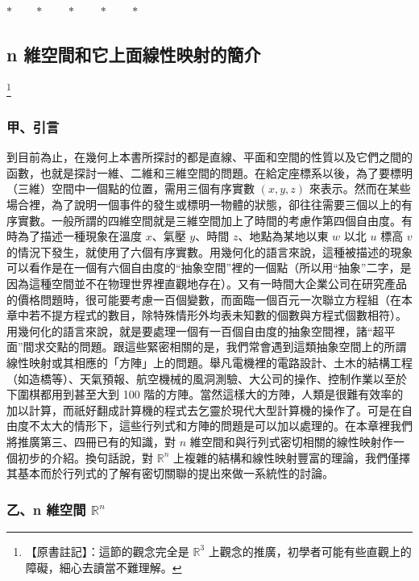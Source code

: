 \begin{center}
$* \qquad * \qquad * \qquad * \qquad *$
\end{center}

\subsection{n 維空間和它上面線性映射的簡介}\label{sec:b6-1-1}
\footnote{【原書註記】：這節的觀念完全是 $\mathbb{R}^3$ 上觀念的推廣，初學者可能有些直觀上的障礙，細心去讀當不難理解。}

\subsubsection*{甲、引言}\label{subsec:b6-1-1-a}

到目前為止，在幾何上本書所探討的都是直線、平面和空間的性質以及它們之間的函數，也就是探討一維、二維和三維空間的問題。在給定座標系以後，為了要標明（三維）空間中一個點的位置，需用三個有序實數 $(x, y, z)$ 來表示。然而在某些場合裡，為了說明一個事件的發生或標明一物體的狀態，卻往往需要三個以上的有序實數。一般所謂的四維空間就是三維空間加上了時間的考慮作第四個自由度。有時為了描述一種現象在溫度 $x$、氣壓 $y$、時間 $z$、地點為某地以東 $w$ 以北 $u$ 標高 $v$ 的情況下發生，就使用了六個有序實數。用幾何化的語言來說，這種被描述的現象可以看作是在一個有六個自由度的“抽象空間”裡的一個點（所以用“抽象”二字，是因為這種空間並不在物理世界裡直觀地存在）。又有一時間大企業公司在研究產品的價格問題時，很可能要考慮一百個變數，而面臨一個百元一次聯立方程組（在本章中若不提方程式的數目，除特殊情形外均表未知數的個數與方程式個數相符）。用幾何化的語言來說，就是要處理一個有一百個自由度的抽象空間裡，諸“超平面”間求交點的問題。跟這些緊密相關的是，我們常會遇到這類抽象空間上的所謂線性映射或其相應的「方陣」上的問題。舉凡電機裡的電路設計、土木的結構工程（如造橋等）、天氣預報、航空機械的風洞測驗、大公司的操作、控制作業以至於下圍棋都用到甚至大到 100 階的方陣。當然這樣大的方陣，人類是很難有效率的加以計算，而祇好翻成計算機的程式去乞靈於現代大型計算機的操作了。可是在自由度不太大的情形下，這些行列式和方陣的問題是可以加以處理的。在本章裡我們將推廣第三、四冊已有的知識，對 $n$ 維空間和與行列式密切相關的線性映射作一個初步的介紹。換句話說，對 $\mathbb{R}^n$ 上複雜的結構和線性映射豐富的理論，我們僅擇其基本而於行列式的了解有密切關聯的提出來做一系統性的討論。

\subsubsection*{乙、n 維空間 $\mathbb{R}^n$}\label{subsec:b6-1-1-b}

